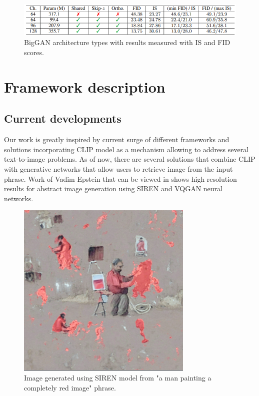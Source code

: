\documentclass[12pt,a4paper,openany]{book}
\begin{document}
\begin{figure}[ht!]
    \centering
    \includegraphics[scale=0.7]{figs/biggan_table.png}
    \caption{BigGAN architecture types with results measured with IS and FID scores.}\label{Fig:biggan_table}
\end{figure}



\chapter{Framework description}

\section{Current developments}

\noindent Our work is greatly inspired by current surge of different frameworks and solutions incorporating CLIP model as a mechanism allowing to address several text-to-image problems. As of now, there are several solutions that combine CLIP with generative networks that allow users to retrieve image from the input phrase. Work of Vadim Epstein that can be viewed in \cite{aphantasia} shows high resolution results for abstract image generation using SIREN \cite{siren} and VQGAN \cite{vqgan} neural networks.\

\begin{figure}[H]
    \centering
    \includegraphics[scale=1.0]{figs/deepdaze.png}
    \caption{Image generated using SIREN \cite{siren} model from "a man painting a completely red image" phrase.}\label{Fig:deepdaze}
\end{figure}
\end{document}
